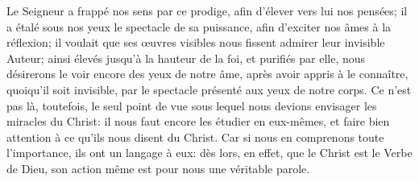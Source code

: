 Le Seigneur a frappé nos sens par ce prodige,
	afin d’élever vers lui nos pensées;
	il a étalé sous nos yeux le spectacle de sa puissance,
	afin d’exciter nos âmes à la réflexion;
	il voulait que ses œuvres visibles nous fissent admirer leur invisible Auteur;
	ainsi élevés jusqu’à la hauteur de la foi, et purifiés par elle,
	nous désirerons le voir encore des yeux de notre âme,
	après avoir appris à le connaître, quoiqu’il soit invisible,
	par le spectacle présenté aux yeux de notre corps.
Ce n’est pas là, toutefois, le seul point de vue
		sous lequel nous devions envisager les miracles du Christ:
	il nous faut encore les étudier en eux-mêmes,
	et faire bien attention à ce qu’ils nous disent du Christ.
Car si nous en comprenons toute l’importance, ils ont un langage à eux:
	dès lors, en effet, que le Christ est le Verbe de Dieu,
	son action même est pour nous une véritable parole.
